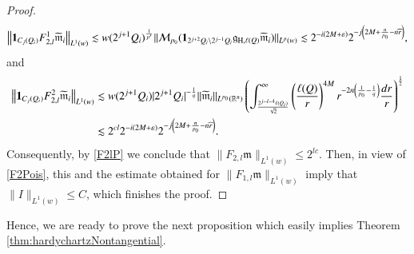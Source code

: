 \documentclass[11pt, a4paper,leqno]{amsart}
\newcommand{\mm}{\mathfrak{m}}
\renewcommand{\chi}{{\bf 1}}
\theoremstyle{plain}
\theoremstyle{definition}
\theoremstyle{remark}
\numberwithin{equation}{section}
\def \R{ \mathbb{R} }
\def \hh{ \mathrm{H} }
\begin{document}
\begin{proof}
$$
\left\|\chi_{C_j(Q_i)}F_{2,l}^1\widetilde{\mm}_i\right\|_{L^1(w)}
\lesssim
 w(2^{j+1}Q_i)^{\frac{1}{p'}}\|\mathcal{M}_{p_0}(\chi_{2^{j+2}Q_i\setminus 2^{j-1}Q_i}\mathfrak{g}_{\hh,\ell(Q)}\widetilde{\mm}_i)\|_{L^p(w)}
\lesssim 
2^{-i\left(2M+\varepsilon\right)}
2^{-j\left(2M+\frac{n}{p_0}-n\widehat{r}\right)},
$$
 and
\begin{align*}
\left\|\chi_{C_j(Q_i)}F_{2,l}^2\widetilde{\mm}_i\right\|_{L^1(w)}
&\lesssim 
w(2^{j+1}Q_i)|2^{j+1}Q_i|^{-\frac{1}{q}}\|\widetilde{\mm}_i\|_{L^{p_0}(\R^n)}\left(\int_{\frac{2^{j-l-4}\ell(Q_i)}{\sqrt{2}}}^{\infty}\left(\frac{\ell(Q)}{r}\right)^{4M}r^{-2n\left(\frac{1}{p_0}-\frac{1}{q}\right)}\frac{dr}{r}\right)^{\frac{1}{2}}
\\
&\lesssim 2^{cl}
2^{-i\left(2M+\varepsilon\right)}
2^{-j\left(2M+\frac{n}{p_0}-n\widehat{r}\right)}.
\end{align*}
Consequently,  by \eqref{F2lP} we conclude that $\|F_{2,l}\mm\|_{L^1(w)}\leq 2^{lc}$. Then, in view of \eqref{F2Pois}, this and the estimate obtained for $\|F_{1,l}\mm\|_{L^1(w)}$ imply that
$\|I\|_{L^1(w)}\leq C$, which finishes the proof.
\end{proof}

\bigskip

Hence, we are ready to  prove the next proposition which easily implies Theorem \ref{thm:hardychartzNontangential}.
\end{document}
